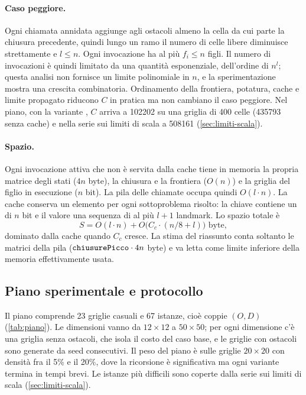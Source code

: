 \paragraph{Caso peggiore.} Ogni chiamata annidata aggiunge agli ostacoli
almeno la cella da cui parte la chiusura precedente, quindi lungo un ramo il
numero di celle libere diminuisce strettamente e $l \le n$. Ogni invocazione
ha al più $f_i \le n$ figli. Il numero di invocazioni è quindi limitato da
una quantità esponenziale, dell'ordine di $n^{l}$; questa analisi non fornisce
un limite polinomiale in $n$, e la sperimentazione mostra una crescita
combinatoria. Ordinamento della frontiera, potatura, cache e limite
propagato riducono $C$ in pratica ma non cambiano il caso peggiore. Nel piano,
con la variante , $C$ arriva a \num{102202} su una griglia di 400
celle (\num{435793} senza cache) e nella serie sui limiti di scala a
\num{508161} (\cref{sec:limiti-scala}).

\paragraph{Spazio.} Ogni invocazione attiva che non è servita dalla cache
tiene in memoria la propria matrice degli stati ($4n$ byte), la chiusura e
la frontiera ($O(n)$) e la griglia del figlio in esecuzione ($n$ bit). La
pila delle chiamate occupa quindi $O(l \cdot n)$. La cache conserva un
elemento per ogni sottoproblema risolto: la chiave contiene un
 di $n$ bit e il valore una sequenza di al più $l+1$ landmark.
Lo spazio totale è
\begin{equation}
  S = O(l \cdot n) + O\bigl(C_c \cdot (n/8 + l)\bigr) \text{ byte},
  \label{eq:spazio}
\end{equation}
dominato dalla cache quando $C_c$ cresce. La stima  del
riassunto conta soltanto le matrici della pila
($\texttt{chiusurePicco} \cdot 4n$ byte) e va letta come limite inferiore
della memoria effettivamente usata.

\subsection{Piano sperimentale e protocollo}
\label{sec:protocollo}

Il piano comprende 23 griglie casuali e 67 istanze, cioè coppie $(O,D)$
(\cref{tab:piano}). Le dimensioni vanno da $12\times12$ a $50\times50$; per
ogni dimensione c'è una griglia senza ostacoli, che isola il costo del caso
base, e le griglie con ostacoli sono generate da seed consecutivi. Il peso
del piano è sulle griglie $20\times20$ con densità fra il 5\% e il 20\%, dove
la ricorsione è significativa ma ogni variante termina in tempi brevi. Le
istanze più difficili sono coperte dalla serie sui limiti di scala
(\cref{sec:limiti-scala}).

